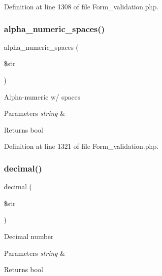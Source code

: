 Definition at line 1308 of file Form\+\_\+validation.\+php.

\mbox{\label{class_c_i___form__validation_a9c7e61a17f9ff3cbf176d7afab3b1555}} 
\subsubsection{\texorpdfstring{alpha\_numeric\_spaces()}{alpha\_numeric\_spaces()}}
{\footnotesize\ttfamily alpha\+\_\+numeric\+\_\+spaces (\begin{DoxyParamCaption}\item[{}]{\$str }\end{DoxyParamCaption})}

Alpha-\/numeric w/ spaces


\begin{DoxyParams}{Parameters}
{\em string} & \\
\hline
\end{DoxyParams}
\begin{DoxyReturn}{Returns}
bool 
\end{DoxyReturn}


Definition at line 1321 of file Form\+\_\+validation.\+php.

\mbox{\label{class_c_i___form__validation_af460b7c2f8d785b7472329446c600f31}} 
\subsubsection{\texorpdfstring{decimal()}{decimal()}}
{\footnotesize\ttfamily decimal (\begin{DoxyParamCaption}\item[{}]{\$str }\end{DoxyParamCaption})}

Decimal number


\begin{DoxyParams}{Parameters}
{\em string} & \\
\hline
\end{DoxyParams}
\begin{DoxyReturn}{Returns}
bool 
\end{DoxyReturn}


